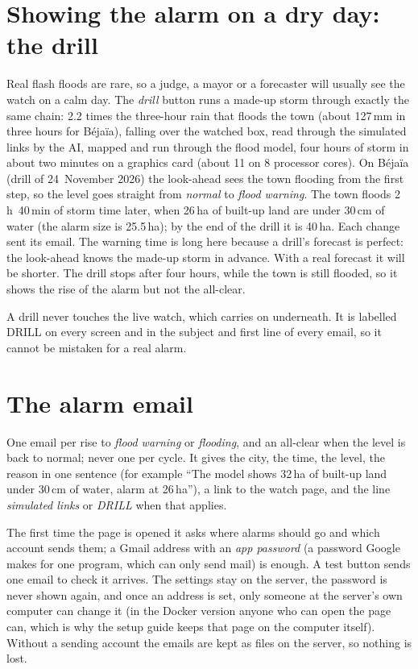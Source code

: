 \section{Showing the alarm on a dry day: the drill}
\label{sec:p7_drill}
Real flash floods are rare, so a judge, a mayor or a forecaster will usually see the watch on a calm day. The
\emph{drill} button runs a made-up storm through exactly the same chain: 2.2 times the three-hour rain that floods the
town (about 127\,mm in three hours for Béjaïa), falling over the watched box, read through the simulated links by the
AI, mapped and run through the flood model, four hours of storm in about two minutes on a graphics card (about 11 on 8 processor cores). On Béjaïa (drill of
24~November 2026) the look-ahead sees the town flooding from the first step, so the level goes straight from
\emph{normal} to \emph{flood warning}. The town floods 2\,h~40\,min of storm time later, when 26\,ha of built-up land
are under 30\,cm of water (the alarm size is 25.5\,ha); by the end of the drill it is 40\,ha. Each change sent its
email. The warning time is long here because a drill's forecast is perfect: the look-ahead knows the made-up storm in
advance. With a real forecast it will be shorter. The drill stops after four hours, while the town is still flooded,
so it shows the rise of the alarm but not the all-clear.

A drill never touches the live watch, which carries on underneath. It is labelled DRILL on every screen and in the
subject and first line of every email, so it cannot be mistaken for a real alarm.

\section{The alarm email}
\label{sec:p7_email}
One email per rise to \emph{flood warning} or \emph{flooding}, and an all-clear when the level is back to normal; never
one per cycle. It gives the city, the time, the level, the reason in one sentence (for example ``The model shows 32\,ha
of built-up land under 30\,cm of water, alarm at 26\,ha''), a link to the watch page, and the line \emph{simulated
links} or \emph{DRILL} when that applies.

The first time the page is opened it asks where alarms should go and which account sends them; a Gmail address with an
\emph{app password} (a password Google makes for one program, which can only send mail) is enough. A test button sends
one email to check it arrives. The settings stay on the server, the password is never shown again, and once an address
is set, only someone at the server's own computer can change it (in the Docker version anyone who can open the page can,
which is why the setup guide keeps that page on the computer itself). Without a sending account the emails are kept as
files on the server, so nothing is lost.

